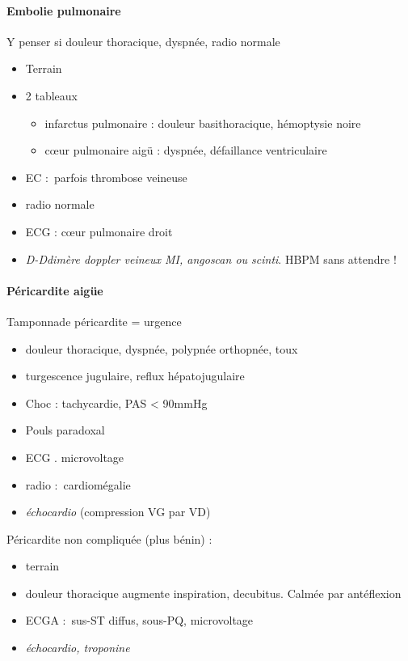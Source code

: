 \paragraph{Embolie pulmonaire} Y penser si douleur thoracique, dyspnée, radio
normale \skull
\begin{itemize}
  \item Terrain
  \item 2 tableaux
    \begin{itemize}
      \item infarctus pulmonaire : douleur basithoracique, hémoptysie noire
      \item c\oe{}ur pulmonaire aigü : dyspnée, défaillance ventriculaire
    \end{itemize}
  \item EC : parfois thrombose veineuse
  \item radio normale
  \item ECG : c\oe{}ur pulmonaire droit
  \item \textit{D-Ddimère \thus doppler veineux MI, angoscan ou scinti}. HBPM sans
    attendre !
\end{itemize}

\paragraph{Péricardite aigüe}
Tamponnade péricardite = urgence \skull
\begin{itemize}
  \item douleur thoracique, dyspnée, polypnée \thus orthopnée, toux
  \item turgescence jugulaire, reflux hépatojugulaire
  \item Choc : tachycardie, PAS < 90mmHg
  \item Pouls paradoxal
  \item ECG . microvoltage
  \item radio : cardiomégalie
  \item \textit{échocardio}  (compression VG par VD)
\end{itemize}

Péricardite non compliquée (plus bénin) :
\begin{itemize}
  \item terrain
  \item douleur thoracique augmente inspiration, decubitus. Calmée par
    antéflexion
  \item ECGA : sus-ST diffus, sous-PQ, microvoltage
  \item \textit{échocardio, troponine} 
\end{itemize}


